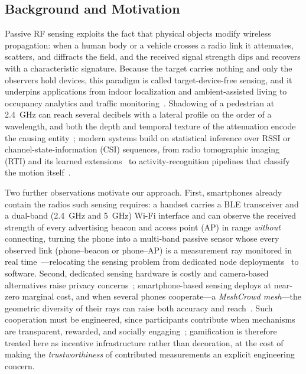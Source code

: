 \documentclass[journal,10pt]{IEEEtran}
\begin{document}
\subsection{Background and Motivation}
Passive RF sensing exploits the fact that physical objects modify wireless
propagation: when a human body or a vehicle crosses a radio link it
attenuates, scatters, and diffracts the field, and the received signal
strength dips and recovers with a characteristic signature. Because the
target carries nothing and only the observers hold devices, this paradigm is
called target-device-free sensing, and it underpins applications from indoor
localization and ambient-assisted living to occupancy analytics and traffic
monitoring~\cite{wilson2010}. Shadowing of a pedestrian at
2.4~GHz can reach several decibels with a lateral profile on the order of a
wavelength, and both the depth and temporal texture of the attenuation encode
the causing entity~\cite{januszkiewicz2018}; modern systems build on
statistical inference over RSSI or channel-state-information (CSI) sequences,
from radio tomographic imaging (RTI) and its learned
extensions~\cite{patwari2010proc,alippi2016,li2024,wu2024,wilson2011} to
activity-recognition pipelines that classify the motion
itself~\cite{wang2015har,wong2024,sanchez2020}.

Two further observations motivate our approach. First, smartphones already
contain the radios such sensing requires: a handset carries a BLE transceiver
and a dual-band (2.4~GHz and 5~GHz) Wi-Fi interface and can observe the
received strength of every advertising beacon and access point (AP) in range
\emph{without} connecting, turning the phone into a multi-band passive sensor
whose every observed link (phone--beacon or phone--AP) is a measurement ray
monitored in real time~\cite{ramirez2021,milano2024}---relocating the
sensing problem from dedicated node
deployments~\cite{wilson2010,alippi2016} to software. Second, dedicated
sensing hardware is costly and camera-based alternatives raise privacy
concerns~\cite{khan2023,zhou2020}; smartphone-based sensing deploys at
near-zero marginal cost, and when several phones cooperate---a \emph{MeshCrowd
mesh}---the geometric diversity of their rays can raise both accuracy and
reach~\cite{li2024}. Such cooperation must be engineered, since participants
contribute when mechanisms are transparent, rewarded, and socially
engaging~\cite{zhang2022,wang2018}; gamification is therefore treated here as
incentive infrastructure rather than decoration, at the cost of making the
\emph{trustworthiness} of contributed measurements an explicit engineering
concern.
\end{document}
